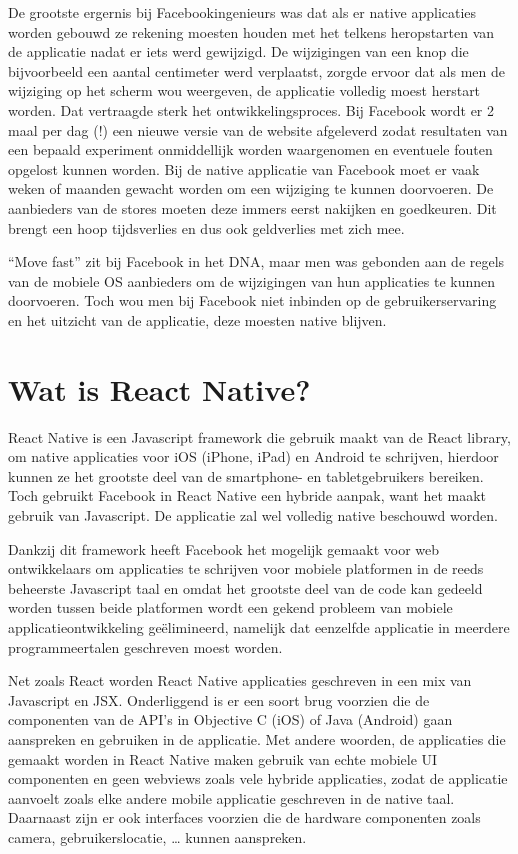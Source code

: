 De grootste ergernis bij Facebookingenieurs was dat als er native applicaties worden gebouwd ze rekening moesten houden met het telkens heropstarten van de applicatie nadat er iets werd gewijzigd. De wijzigingen van een knop die bijvoorbeeld een aantal centimeter werd verplaatst, zorgde ervoor dat als men de wijziging op het scherm wou weergeven, de applicatie volledig moest herstart worden. Dat vertraagde sterk het ontwikkelingsproces.
Bij Facebook wordt er 2 maal per dag (!) een nieuwe versie van de website afgeleverd zodat resultaten van een bepaald experiment onmiddellijk worden waargenomen en eventuele fouten opgelost kunnen worden. Bij de native applicatie van Facebook moet er vaak weken of maanden gewacht worden om een wijziging te kunnen doorvoeren. De aanbieders van de stores moeten deze immers eerst nakijken en goedkeuren. Dit brengt een hoop tijdsverlies  en dus ook geldverlies met zich mee. 

``Move fast'' zit bij Facebook in het DNA, maar men was gebonden aan de regels van de mobiele OS aanbieders om de wijzigingen van hun applicaties te kunnen doorvoeren. Toch wou men bij Facebook niet inbinden op de gebruikerservaring en het uitzicht van de applicatie, deze moesten native blijven. \citep{occhino:React}

\section{Wat is React Native?}
React Native is een Javascript framework die gebruik maakt van de React library, om native applicaties voor iOS (iPhone, iPad) en Android te schrijven, hierdoor kunnen ze het grootste deel van de smartphone- en tabletgebruikers bereiken. Toch gebruikt Facebook in React Native een hybride aanpak, want het maakt gebruik van Javascript. De applicatie zal wel volledig native beschouwd worden.

Dankzij dit framework heeft Facebook het mogelijk gemaakt voor web ontwikkelaars om applicaties te schrijven voor mobiele platformen in de reeds beheerste Javascript taal en omdat het grootste deel van de code kan gedeeld worden tussen beide platformen wordt een gekend probleem van mobiele applicatieontwikkeling geëlimineerd, namelijk dat eenzelfde applicatie in meerdere programmeertalen geschreven moest worden. 

Net zoals React worden React Native applicaties geschreven in een mix van Javascript en JSX. Onderliggend is er een soort brug voorzien die de componenten van de API’s in Objective C (iOS) of Java (Android) gaan aanspreken en gebruiken in de applicatie. Met andere woorden, de applicaties die gemaakt worden in React Native maken gebruik van echte mobiele UI componenten en geen webviews zoals vele hybride applicaties, zodat de applicatie aanvoelt zoals elke andere mobile applicatie geschreven in de native taal. Daarnaast zijn er ook interfaces voorzien die de hardware componenten zoals camera, gebruikerslocatie, … kunnen aanspreken. \citep{eisenman:react}

